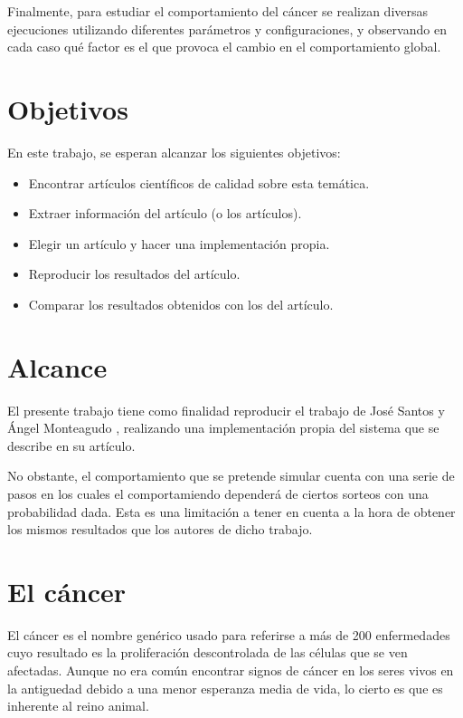 Finalmente, para estudiar el comportamiento del cáncer se realizan diversas ejecuciones utilizando diferentes parámetros y configuraciones,
y observando en cada caso qué factor es el que provoca el cambio en el comportamiento global.

\section{Objetivos}

En este trabajo, se esperan alcanzar los siguientes objetivos:

\begin{itemize}
  \item Encontrar artículos científicos de calidad sobre esta temática.
  \item Extraer información del artículo (o los artículos).
  \item Elegir un artículo y hacer una implementación propia.
  \item Reproducir los resultados del artículo.
  \item Comparar los resultados obtenidos con los del artículo.
\end{itemize}

\section{Alcance}

El presente trabajo tiene como finalidad reproducir el trabajo de José Santos y Ángel Monteagudo \cite{jsantos-amonteagudo-1-2014}, realizando
una implementación propia del sistema que se describe en su artículo.

No obstante, el comportamiento que se pretende simular cuenta con una serie de pasos en los cuales el comportamiendo dependerá
de ciertos sorteos con una probabilidad dada. Esta es una limitación a tener en cuenta a la hora de obtener los mismos resultados
que los autores de dicho trabajo.

\section{El cáncer}

El cáncer es el nombre genérico usado para referirse a más de 200 enfermedades cuyo resultado
es la proliferación descontrolada de las células que se ven afectadas. Aunque no era común
encontrar signos de cáncer en los seres vivos en la antiguedad debido a una menor esperanza
media de vida, lo cierto es que es inherente al reino animal.

